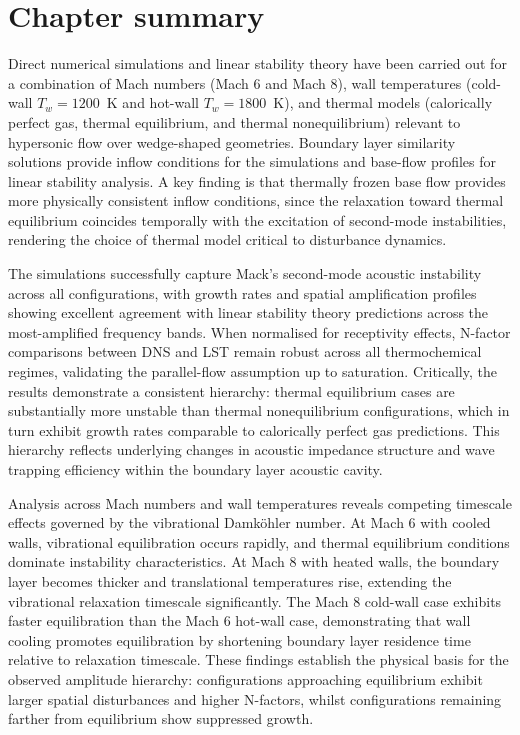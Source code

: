 \section{Chapter summary}

Direct numerical simulations and linear stability theory have been carried out for a combination of Mach numbers (Mach 6 and Mach 8), wall temperatures (cold-wall $T_w = 1200$~K and hot-wall $T_w = 1800$~K), and thermal models (calorically perfect gas, thermal equilibrium, and thermal nonequilibrium) relevant to hypersonic flow over wedge-shaped geometries. Boundary layer similarity solutions provide inflow conditions for the simulations and base-flow profiles for linear stability analysis. A key finding is that thermally frozen base flow provides more physically consistent inflow conditions, since the relaxation toward thermal equilibrium coincides temporally with the excitation of second-mode instabilities, rendering the choice of thermal model critical to disturbance dynamics.

The simulations successfully capture Mack's second-mode acoustic instability across all configurations, with growth rates and spatial amplification profiles showing excellent agreement with linear stability theory predictions across the most-amplified frequency bands. When normalised for receptivity effects, N-factor comparisons between DNS and \gls{LST} remain robust across all thermochemical regimes, validating the parallel-flow assumption up to saturation. Critically, the results demonstrate a consistent hierarchy: thermal equilibrium cases are substantially more unstable than thermal nonequilibrium configurations, which in turn exhibit growth rates comparable to calorically perfect gas predictions. This hierarchy reflects underlying changes in acoustic impedance structure and wave trapping efficiency within the boundary layer acoustic cavity.

Analysis across Mach numbers and wall temperatures reveals competing timescale effects governed by the vibrational Damköhler number. At Mach 6 with cooled walls, vibrational equilibration occurs rapidly, and thermal equilibrium conditions dominate instability characteristics. At Mach 8 with heated walls, the boundary layer becomes thicker and translational temperatures rise, extending the vibrational relaxation timescale significantly. The Mach 8 cold-wall case exhibits faster equilibration than the Mach 6 hot-wall case, demonstrating that wall cooling promotes equilibration by shortening boundary layer residence time relative to relaxation timescale. These findings establish the physical basis for the observed amplitude hierarchy: configurations approaching equilibrium exhibit larger spatial disturbances and higher N-factors, whilst configurations remaining farther from equilibrium show suppressed growth.

